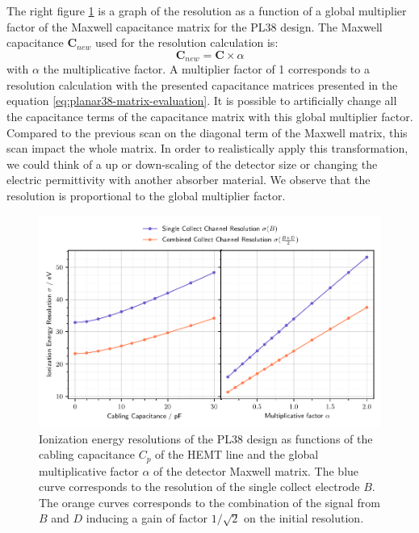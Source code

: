 The right figure \ref{fig:planar38-scan} is a graph of the resolution as a function of a global multiplier factor of the Maxwell capacitance matrix for the PL38 design. The Maxwell capacitance $\bm{C}_{new}$ used for the resolution calculation is:
\begin{equation}
\bm{C}_{new} = \bm{C} \times \alpha
\end{equation}
with $\alpha$ the multiplicative factor. A multiplier factor of 1 corresponds to a resolution calculation with the presented capacitance matrices presented in the equation \ref{eq:planar38-matrix-evaluation}. It is possible to artificially change all the capacitance terms of the capacitance matrix with this global multiplier factor. Compared to the previous scan on the diagonal term of the Maxwell matrix, this scan impact the whole matrix. In order to realistically apply this transformation, we could think of a up or down-scaling of the detector size or changing the electric permittivity with another absorber material. We observe that the resolution is proportional to the global multiplier factor.

\begin{figure}
\centering
\includegraphics[scale=1]{Figures/Electrodes/pl38_scanplot.pdf}
\caption{Ionization energy resolutions of the PL38 design as functions of the cabling capacitance $C_p$ of the HEMT line and the global multiplicative factor $\alpha$ of the detector Maxwell matrix. The blue curve corresponds to the resolution of the single collect electrode $B$. The orange curves corresponds to the combination of the signal from $B$ and $D$ inducing a gain of factor $1/\sqrt{2}$ on the initial resolution.
}
\label{fig:planar38-scan}
\end{figure}

